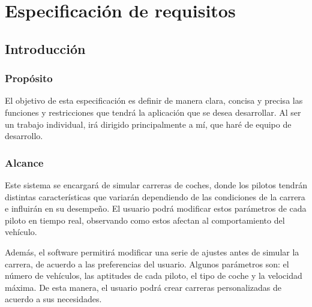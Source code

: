 \chapter{Especificación de requisitos}

\section{Introducción}

\subsection{Propósito}
El objetivo de esta especificación es definir de manera clara, concisa y precisa las funciones y restricciones que tendrá la aplicación que se desea desarrollar. Al ser un trabajo individual, irá dirigido principalmente a mí, que haré de equipo de desarrollo.

\subsection{Alcance}




Este sistema se encargará de simular carreras de coches, donde los pilotos tendrán distintas características que variarán dependiendo de las condiciones de la carrera e influirán en su desempeño. El usuario podrá modificar estos parámetros de cada piloto en tiempo real, observando como estos afectan al comportamiento del vehículo.

\bigskip

Además, el software permitirá modificar una serie de ajustes antes de simular la carrera, de acuerdo a las preferencias del usuario. Algunos parámetros son: el número de vehículos, las aptitudes de cada piloto, el tipo de coche y la velocidad máxima. De esta manera, el usuario podrá crear carreras personalizadas de acuerdo a sus necesidades.

